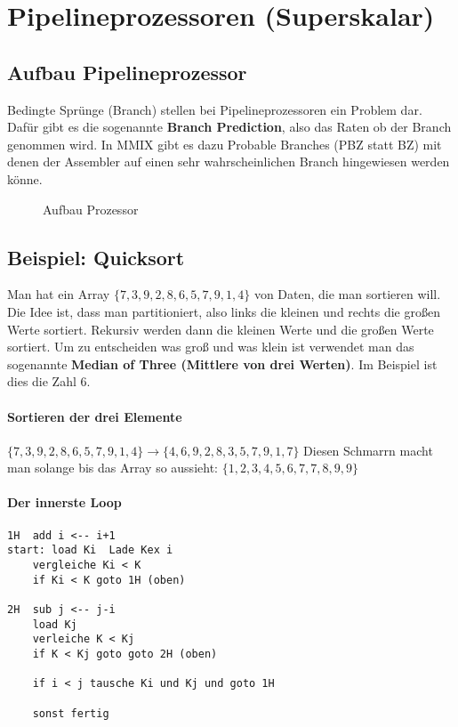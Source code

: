 \renewcommand{\ldate}{2015-06-03}	%
\fancyfoot[R]{\tiny{SS 2015 / \ldate}}

\section{Pipelineprozessoren (Superskalar)}

\subsection{Aufbau Pipelineprozessor}
Bedingte Sprünge (Branch) stellen bei Pipelineprozessoren ein Problem dar. Dafür gibt es die sogenannte \textbf{Branch Prediction}, also das Raten ob der Branch genommen wird. In MMIX gibt es dazu Probable Branches (PBZ statt BZ) mit denen der Assembler auf einen sehr wahrscheinlichen Branch hingewiesen werden könne.  
\begin{figure}[htbp]
\caption{Aufbau Prozessor}
\label{fig:aufbau_prozessor}
\end{figure}

\subsection{Beispiel: Quicksort} 
Man hat ein Array $\{7,3,9,2,8,6,5,7,9,1,4\}$ von Daten, die man sortieren will. Die Idee ist, dass man partitioniert, also links die kleinen und rechts die großen Werte sortiert. Rekursiv werden dann die kleinen Werte und die großen Werte sortiert. Um zu entscheiden was groß und was klein ist verwendet man das sogenannte \textbf{Median of Three (Mittlere von drei Werten)}. Im Beispiel ist dies die Zahl 6. 
\paragraph{Sortieren der drei Elemente} $\{7,3,9,2,8,6,5,7,9,1,4\} \rightarrow \{4,6,9,2,8,3,5,7,9,1,7\}$ Diesen Schmarrn macht man solange bis das Array so aussieht: $\{1,2,3,4,5,6,7,7,8,9,9\}$

\paragraph{Der innerste Loop} 

\begin{lstlisting}
1H	add i <-- i+1
start: load Ki	Lade Kex i
	vergleiche Ki < K
	if Ki < K goto 1H (oben)
	
2H	sub j <-- j-i
	load Kj
	verleiche K < Kj
	if K < Kj goto goto 2H (oben)
	
	if i < j tausche Ki und Kj und goto 1H

	sonst fertig
\end{lstlisting}


